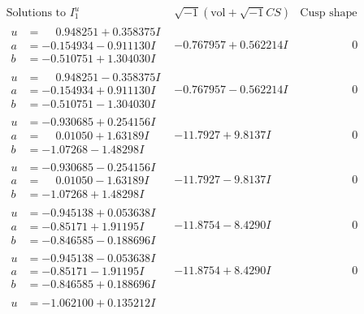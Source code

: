 \documentclass[1p]{elsarticle_modified}
\theoremstyle{definition}
\newcommand{\I}{\sqrt{-1}}
\begin{document}
$$\begin{array}{c|c|c}  
\text{Solutions to }I^u_{1}& \I (\text{vol} + \sqrt{-1}CS) & \text{Cusp shape}\\
 \hline 
\begin{aligned}
u &= \phantom{-}0.948251 + 0.358375 I \\
a &= -0.154934 - 0.911130 I \\
b &= -0.510751 + 1.304030 I\end{aligned}
 & -0.767957 + 0.562214 I & \phantom{-0.000000 } 0 \\ \hline\begin{aligned}
u &= \phantom{-}0.948251 - 0.358375 I \\
a &= -0.154934 + 0.911130 I \\
b &= -0.510751 - 1.304030 I\end{aligned}
 & -0.767957 - 0.562214 I & \phantom{-0.000000 } 0 \\ \hline\begin{aligned}
u &= -0.930685 + 0.254156 I \\
a &= \phantom{-}0.01050 + 1.63189 I \\
b &= -1.07268 - 1.48298 I\end{aligned}
 & -11.7927 + 9.8137 I & \phantom{-0.000000 } 0 \\ \hline\begin{aligned}
u &= -0.930685 - 0.254156 I \\
a &= \phantom{-}0.01050 - 1.63189 I \\
b &= -1.07268 + 1.48298 I\end{aligned}
 & -11.7927 - 9.8137 I & \phantom{-0.000000 } 0 \\ \hline\begin{aligned}
u &= -0.945138 + 0.053638 I \\
a &= -0.85171 + 1.91195 I \\
b &= -0.846585 - 0.188696 I\end{aligned}
 & -11.8754 - 8.4290 I & \phantom{-0.000000 } 0 \\ \hline\begin{aligned}
u &= -0.945138 - 0.053638 I \\
a &= -0.85171 - 1.91195 I \\
b &= -0.846585 + 0.188696 I\end{aligned}
 & -11.8754 + 8.4290 I & \phantom{-0.000000 } 0 \\ \hline\begin{aligned}
u &= -1.062100 + 0.135212 I \\

\end{aligned}
\end{array}$$
\end{document}
